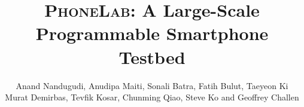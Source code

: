 



\title{\textsc{\LARGE PhoneLab}: A Large-Scale Programmable Smartphone
Testbed}


\author{
\alignauthor
Anand Nandugudi, Anudipa Maiti, Sonali Batra, Fatih Bulut, Taeyeon Ki\\
Murat Demirbas, Tevfik Kosar, Chunming Qiao, Steve Ko and Geoffrey
Challen\\[0.1in]
\\
\\
}

\maketitle

\begin{abstract}

\end{abstract}




{\footnotesize


}


